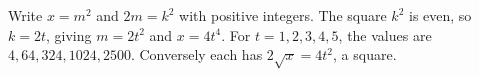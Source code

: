 Write $x=m^2$ and $2m=k^2$ with positive integers. The square $k^2$ is even, so $k=2t$, giving $m=2t^2$ and $x=4t^4$. For $t=1,2,3,4,5$, the values are $\boxed{4,64,324,1024,2500}$. Conversely each has $2\sqrt x=4t^2$, a square.
